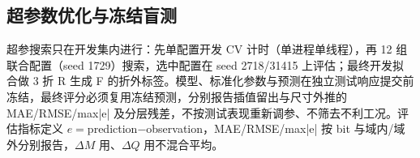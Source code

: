 \subsection{超参数优化与冻结盲测}

超参搜索只在开发集内进行：先单配置开发 CV 计时（单进程单线程），再 12 组联合配置（seed 1729）搜索，选中配置在 seed 2718/31415 上评估；最终开发拟合做 3 折 R 生成 F 的折外标签。模型、标准化参数与预测在独立测试响应提交前冻结，最终评分必须复用冻结预测，分别报告插值留出与尺寸外推的 MAE/RMSE/max|e| 及分层残差，不按测试表现重新调参、不筛去不利工况。评估指标定义 $e=$prediction$-$observation，MAE/RMSE/max|e| 按 bit 与域内/域外分别报告，$\Delta M$ 用\mV、$\Delta Q$ 用\fC 不混合平均。
